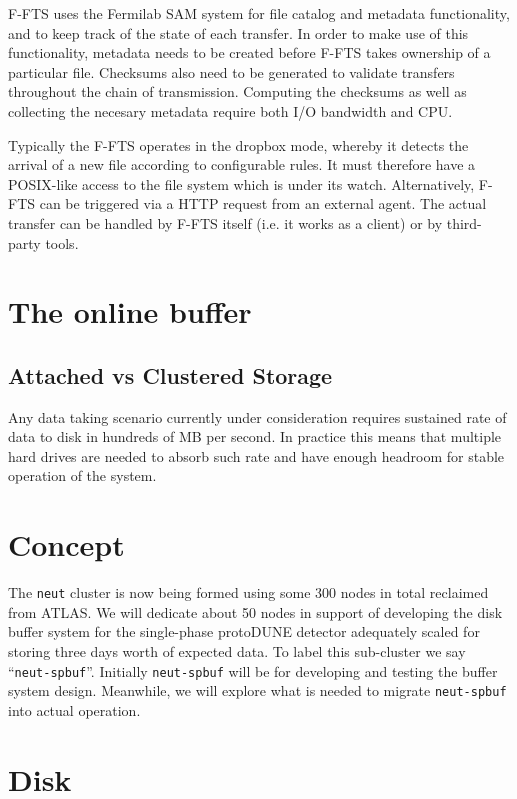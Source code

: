 \documentclass[pdftex,12pt,letter]{article}
\begin{document}
 \noindent F-FTS uses the Fermilab SAM system for file catalog and metadata functionality,
and to keep track of the state of each transfer. In order to make use of this functionality, metadata
needs to be created before F-FTS takes ownership of a particular file. Checksums also need to be
generated to validate transfers throughout the chain of transmission. Computing the checksums
as well as collecting the necesary metadata require both I/O bandwidth and CPU.

Typically the F-FTS operates in the dropbox mode, whereby it detects the arrival of a new file
according to configurable rules. It must therefore have a POSIX-like access to the file
system which is under its watch. Alternatively, F-FTS can be triggered via a HTTP request
from an external agent. The actual transfer can be handled by F-FTS itself (i.e. it works
as a client) or by third-party tools.

\section{The online buffer}
\subsection{Attached vs Clustered Storage}
Any data taking scenario currently under consideration requires sustained rate
of data to disk in hundreds of MB per second. In practice this means that
multiple hard drives are needed to absorb such rate and have enough headroom
for stable operation of the system.



\section{Concept}

The \texttt{neut} cluster is now being formed using some 300 nodes in
total reclaimed from ATLAS.  We will dedicate about 50 nodes in
support of developing the disk buffer system for the single-phase
protoDUNE detector adequately scaled for storing three days worth of
expected data.  To label this sub-cluster we say
``\texttt{neut-spbuf}''.  Initially \texttt{neut-spbuf} will be for
developing and testing the buffer system design.  Meanwhile, we will
explore what is needed to migrate \texttt{neut-spbuf} into actual
operation.

\section{Disk}
\end{document}
